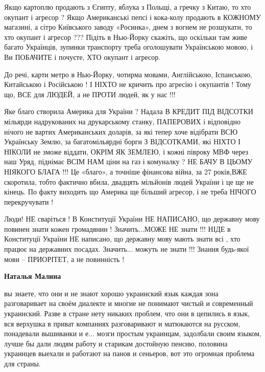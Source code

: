\begin{itemize}
\begin{itemize}
Якщо картоплю продають з Єгипту, яблука з Польщі, а
гречку з Китаю, то хто окупант і агресор ? Якщо Американські пепсі і кока-колу
продають в КОЖНОМУ магазині, а сітро Київського заводу «Росинка», днем з вогнем
не розшукати, то хто окупант і агресор ??? Підіть в Нью-Йорку скажіть, що
оскільки там живе багато Українців, зупинки транспорту треба оголошувати
Українською мовою, і Ви ПОБАЧИТЕ і почуєте, ХТО окупант і агресор. 

До речі, карти метро в Нью-Йорку, чотирма мовами, Англійською, Іспанською,
Китайською і Російською ! І НІХТО не кричить про агресію і окупантів ! Тому що,
ВСЕ для ЛЮДЕЙ, а не ПРОТИ людей, як у нас !!!

Яке благо створила Америка для України ? Надала В КРЕДИТ ПІД ВІДСОТКИ мільярди
надрукованих на друкарському станку, ПАПЕРОВИХ і відповідно нічого не вартих
Американських доларів, за які тепер хоче відібрати ВСЮ Українську Землю, за
багатомільярдні борги З ВІДСОТКАМИ, які НІХТО І НІКОЛИ не зможе віддати, ОКРІМ
ЯК ЗЕМЛЕЮ, і кожні півроку МВФ через наш Уряд, піднімає ВСІМ НАМ ціни на газ і
комуналку ? НЕ БАЧУ В ЦЬОМУ НІЯКОГО БЛАГА !!! Це «благо», а точніше фінансова
війна, за 27 років,ВЖЕ скоротила, тобто фактично вбила, двадцять мільйонів
людей України і це ще не кінець. По факту виходить що Америка ще більший
агресор, і не треба НІЧОГО перекручувати !

Люди! НЕ сваріться ! В Конституції України НЕ НАПИСАНО, що державну мову
повинен знати кожен громадянин ! Значить...МОЖЕ НЕ знати !!! НІДЕ в Конституції
України НЕ написано, що державну мову мають знати всі , хто працює на державних
посадах. Значить... можуть не знати !!! Знання будь-якої мови – ПРИОРІТЕТ, а не
повинність !


\textbf{Наталья Малина} 

вы знаете, что они и не знают хорошо украинский язык каждая зона разговаривает
на своём диалекте и многие не понимают чистый и современный украинский. Разве в
стране нету никаких проблем, что они в цепились в язык, вся верхушка в приват
компаниях разговаривают и матюкаются на русском, понадевали вышиванки и е...
мозги простым украинцам, задолбали своим языком, лучше бы дали людям работу и
старикам достойную пенсию, половина украинцев выехали и работают на панов и
сеньеров, вот это огромная проблема для страны.




\end{itemize}
\end{itemize}

